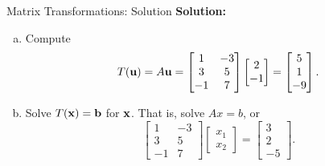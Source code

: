 \begin{frame}{Matrix Transformations: Solution}
\textbf{Solution:}
\pause
\begin{enumerate}[a.]
\item Compute
\[
T(\mathbf{u})=A\mathbf{u}=
\begin{bmatrix}1&-3\\3&5\\-1&7\end{bmatrix}
\begin{bmatrix}2\\-1\end{bmatrix}
=\begin{bmatrix}5\\1\\-9\end{bmatrix}.
\]
\pause
\item Solve $T(\mathbf{x})=\mathbf{b}$ for $\mathbf{x}$. That is, solve $Ax=b$, or
\[
\begin{bmatrix}1&-3\\3&5\\-1&7\end{bmatrix}
\begin{bmatrix}x_1\\x_2\end{bmatrix}
=\begin{bmatrix}3\\2\\-5\end{bmatrix}. \tag{1}
\]
\end{enumerate}
\end{frame}

